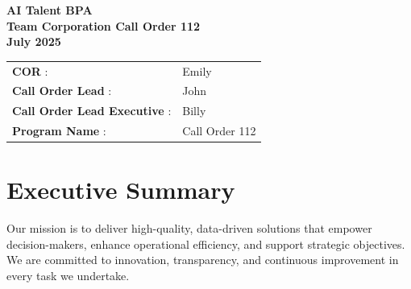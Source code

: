 \documentclass{article}
\begin{document}

\pagestyle{fancy}
\fancyhf{}
\fancyfoot[C]{\thepage}


\begin{center}
\LARGE \textbf{ AI Talent BPA } \\
\large \textbf{ Team Corporation Call Order 112 } \\
\large \textbf{ July 2025 } \\
\end{center}

\vspace{1cm}

\noindent
\begin{tabular}{@{} l l @{}}

\textbf{ COR }: & Emily \\

\textbf{ Call Order Lead }: & John \\

\textbf{ Call Order Lead Executive }: & Billy \\

\textbf{ Program Name }: & Call Order 112 \\

\end{tabular}

\vspace{1.5cm}

\section*{ Executive Summary }

Our mission is to deliver high-quality, data-driven solutions that empower decision-makers, enhance operational efficiency, and support strategic objectives. We are committed to innovation, transparency, and continuous improvement in every task we undertake.
\end{document}
